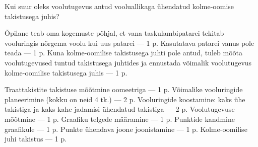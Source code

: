 
Kui suur oleks voolutugevus antud vooluallikaga ühendatud kolme-oomise takistusega juhis?

\hint

\solu
Õpilane teab oma kogemuste põhjal, et vana taskulambipatarei tekitab vooluringis nõrgema voolu kui uus patarei --- 1 p. Kasutatava patarei vanus pole teada --- 1 p. Kuna kolme-oomilise takistusega juhti pole antud, tuleb mõõta voolutugevused tuntud takistusega juhtides ja ennustada võimalik voolutugevus kolme-oomilise takistusega juhis --- 1 p.

Traattakistite takistuse mõõtmine oomeetriga --- 1 p. Võimalike vooluringide planeerimine (kokku on neid 4 tk.) --- 2 p. Vooluringide koostamine: kaks ühe takistiga ja kaks kahe jadamisi ühendatud takistiga --- 2 p. Voolutugevuse mõõtmine --- 1 p. Graafiku telgede määramine --- 1 p. Punktide kandmine graafikule --- 1 p. Punkte ühendava joone joonistamine --- 1 p. Kolme-oomilise juhi takistus --- 1 p.
\probend
